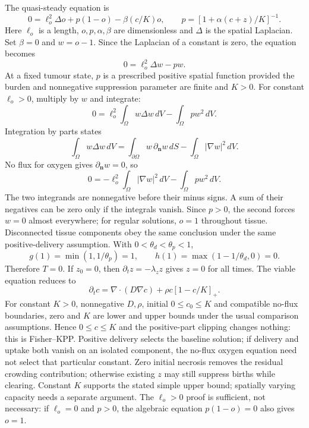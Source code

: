 The quasi-steady equation is
\[
0=\ell_o^2\Delta o+p(1-o)-\beta(c/K)o,\qquad
p=[1+\alpha(c+z)/K]^{-1}.
\]
Here $\ell_o$ is a length, $o,p,\alpha,\beta$ are dimensionless and $\Delta$ is the spatial Laplacian. Set $\beta=0$ and $w=o-1$. Since the Laplacian of a constant is zero, the equation becomes
\[
0=\ell_o^2\Delta w-pw.
\]
At a fixed tumour state, $p$ is a prescribed positive spatial function provided the burden and nonnegative suppression parameter are finite and $K>0$.
For constant $\ell_o>0$, multiply by $w$ and integrate:
\[
0=\ell_o^2\int_\Omega w\Delta w\,dV-\int_\Omega pw^2\,dV.
\]
Integration by parts states
\[
\int_\Omega w\Delta w\,dV
=\int_{\partial\Omega}w\,\partial_{\mathbf n}w\,dS
-\int_\Omega|\nabla w|^2\,dV.
\]
No flux for oxygen gives $\partial_{\mathbf n}w=0$, so
\[
0=-\ell_o^2\int_\Omega|\nabla w|^2\,dV-\int_\Omega pw^2\,dV.
\]
The two integrands are nonnegative before their minus signs. A sum of their negatives can be zero only if the integrals vanish. Since $p>0$, the second forces $w=0$ almost everywhere; for regular solutions, $o=1$ throughout tissue. Disconnected tissue components obey the same conclusion under the same positive-delivery assumption.
With $0<\theta_d<\theta_p<1$,
\[
g(1)=\min(1,1/\theta_p)=1,\qquad
h(1)=\max(1-1/\theta_d,0)=0.
\]
Therefore $T=0$. If $z_0=0$, then $\partial_tz=-\lambda_z z$ gives $z=0$ for all times. The viable equation reduces to
\[
\partial_tc=\nabla\!\cdot(D\nabla c)+\rho c[1-c/K]_+.
\]
For constant $K>0$, nonnegative $D,\rho$, initial $0\leq c_0\leq K$ and compatible no-flux boundaries, zero and $K$ are lower and upper bounds under the usual comparison assumptions. Hence $0\leq c\leq K$ and the positive-part clipping changes nothing: this is Fisher--KPP.
Positive delivery selects the baseline solution; if delivery and uptake both vanish on an isolated component, the no-flux oxygen equation need not select that particular constant. Zero initial necrosis removes the residual crowding contribution; otherwise existing $z$ may still suppress births while clearing. Constant $K$ supports the stated simple upper bound; spatially varying capacity needs a separate argument. The $\ell_o>0$ proof is sufficient, not necessary: if $\ell_o=0$ and $p>0$, the algebraic equation $p(1-o)=0$ also gives $o=1$.
